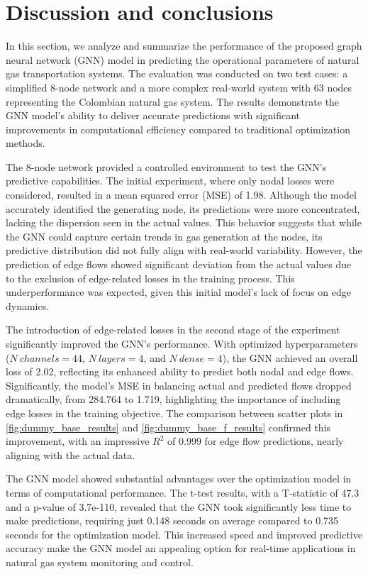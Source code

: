 \section{Discussion and conclusions}

In this section, we analyze and summarize the performance of the proposed graph neural network (GNN) model in predicting the operational parameters of natural gas transportation systems. The evaluation was conducted on two test cases: a simplified 8-node network and a more complex real-world system with 63 nodes representing the Colombian natural gas system. The results demonstrate the GNN model's ability to deliver accurate predictions with significant improvements in computational efficiency compared to traditional optimization methods.


The 8-node network provided a controlled environment to test the GNN's predictive capabilities. The initial experiment, where only nodal losses were considered, resulted in a mean squared error (MSE) of 1.98. Although the model accurately identified the generating node, its predictions were more concentrated, lacking the dispersion seen in the actual values. This behavior suggests that while the GNN could capture certain trends in gas generation at the nodes, its predictive distribution did not fully align with real-world variability. However, the prediction of edge flows showed significant deviation from the actual values due to the exclusion of edge-related losses in the training process. This underperformance was expected, given this initial model's lack of focus on edge dynamics.


The introduction of edge-related losses in the second stage of the experiment significantly improved the GNN's performance. With optimized hyperparameters ($N\ channels=44$, $N\ layers=4$, and $N\ dense=4$), the GNN achieved an overall loss of 2.02, reflecting its enhanced ability to predict both nodal and edge flows. Significantly, the model's MSE in balancing actual and predicted flows dropped dramatically, from 284.764 to 1.719, highlighting the importance of including edge losses in the training objective. The comparison between scatter plots in \cref{fig:dummy_base_results} and \cref{fig:dummy_base_f_results} confirmed this improvement, with an impressive $R^2$ of 0.999 for edge flow predictions, nearly aligning with the actual data.

The GNN model showed substantial advantages over the optimization model in terms of computational performance. The t-test results, with a T-statistic of 47.3 and a p-value of 3.7e-110, revealed that the GNN took significantly less time to make predictions, requiring just 0.148 seconds on average compared to 0.735 seconds for the optimization model. This increased speed and improved predictive accuracy make the GNN model an appealing option for real-time applications in natural gas system monitoring and control.





